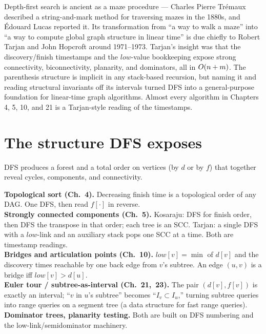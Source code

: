\begin{historybox}
Depth-first search is ancient as a maze procedure --- Charles Pierre Tr\'emaux described a string-and-mark method for traversing mazes in the 1880s, and \'Edouard Lucas reported it. Its transformation from ``a way to walk a maze'' into ``a way to compute global graph structure in linear time'' is due chiefly to Robert Tarjan and John Hopcroft around 1971--1973. Tarjan's insight was that the discovery/finish timestamps and the $\mathit{low}$-value bookkeeping expose strong connectivity, biconnectivity, planarity, and dominators, all in $O(n+m)$. The parenthesis structure is implicit in any stack-based recursion, but naming it and reading structural invariants off its intervals turned DFS into a general-purpose foundation for linear-time graph algorithms. Almost every algorithm in Chapters 4, 5, 10, and 21 is a Tarjan-style reading of the timestamps.
\end{historybox}

\section{The structure DFS exposes}
\label{ch03:structure}

DFS produces a forest and a total order on vertices (by $d$ or by $f$) that together reveal cycles, components, and connectivity.

\begin{applicationbox}
\textbf{Topological sort (Ch.~4).} Decreasing finish time is a topological order of any DAG. One DFS, then read $f[\cdot]$ in reverse. \\[2pt]
\textbf{Strongly connected components (Ch.~5).} Kosaraju: DFS for finish order, then DFS the transpose in that order; each tree is an SCC. Tarjan: a single DFS with a $\mathit{low}$-link and an auxiliary stack pops one SCC at a time. Both are timestamp readings. \\[2pt]
\textbf{Bridges and articulation points (Ch.~10).} $\mathit{low}[v]=\min$ of $d[v]$ and the discovery times reachable by one back edge from $v$'s subtree. An edge $(u,v)$ is a bridge iff $\mathit{low}[v]>d[u]$. \\[2pt]
\textbf{Euler tour / subtree-as-interval (Ch.~21,~23).} The pair $(d[v],f[v])$ is exactly an interval; ``$v$ in $u$'s subtree'' becomes ``$I_v\subset I_u$,'' turning subtree queries into range queries on a segment tree (a data structure for fast range queries). \\[2pt]
\textbf{Dominator trees, planarity testing.} Both are built on DFS numbering and the low-link/semidominator machinery.
\end{applicationbox}

